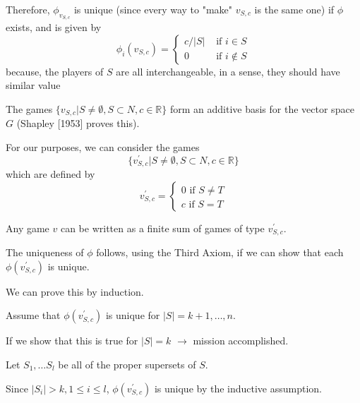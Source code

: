 \documentclass[
paper=128mm:96mm, %
fontsize=11pt, %
pagesize, %
parskip=half-, %
]{scrartcl} %
\theoremstyle{mythmstyle} %
\begin{document}
Therefore, $\phi_{v_{S,c}}$ is unique (since every way to "make" $v_{S,c}$ is the same one) if $\phi$ exists, and is given by
	\[ \phi_{i}(v_{S,c}) = \begin{cases} c / |S| &\text{ if } i \in S \\
                                         0       &\text{ if } i \not\in S
                           \end{cases} \]
because, the players of $S$ are all interchangeable, in a sense, they should have similar value

\clearpage

The games $\{v_{S, c} | S \neq \emptyset, S \subset N, c \in \mathbb{R}\}$ form an additive basis for the vector space $G$ (Shapley [1953] proves this).

For our purposes, we can consider the games
	\[ \{v^{\prime}_{S, c} | S \neq \emptyset, S \subset N, c \in \mathbb{R}\} \]
which are defined by
	\[ v^{\prime}_{S, c} = \begin{cases} 0 \text{ if } S \neq T \\
                                         c \text{ if } S = T
                  \end{cases}\]

Any game $v$ can be written as a finite sum of games of type $v^{\prime}_{S,c}$.

\clearpage

The uniqueness of $\phi$ follows, using the Third Axiom, if we can show that each $\phi(v^{\prime}_{S,c})$ is unique.

We can prove this by induction.

\clearpage

Assume that $\phi(v^{\prime}_{S,c})$ is unique for $|S| = k + 1, \dots, n$.

If we show that this is true for $|S| = k$ $\rightarrow$ mission accomplished.

Let $S_{1}, \dots S_{l}$ be all of the proper supersets of $S$.

Since $|S_{i}| > k, 1 \le i \le l$, $\phi(v^{\prime}_{S,c})$ is unique by the inductive assumption.

\clearpage
\end{document}
